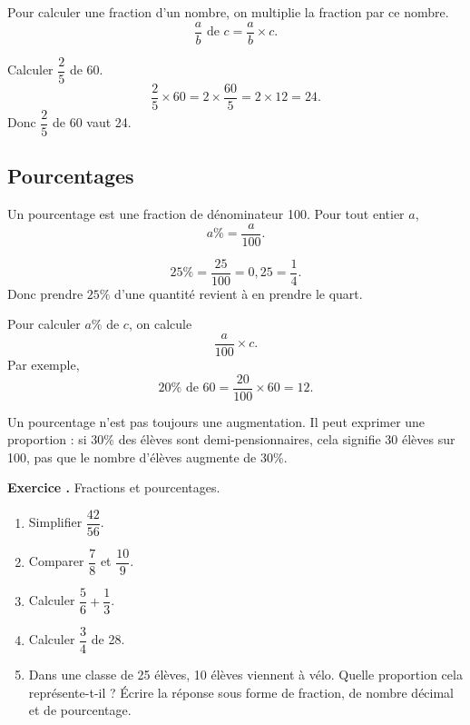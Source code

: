 \documentclass[11pt,a4paper]{article}
\newcounter{exo}
\newcommand{\exercice}[1]{\refstepcounter{exo}\begin{exobox}\textbf{Exercice \theexo.} #1\end{exobox}}
\begin{document}
\begin{proprbox}
Pour calculer une fraction d'un nombre, on multiplie la fraction par ce nombre.
\[
\frac{a}{b}\text{ de }c=\frac{a}{b}\times c.
\]
\end{proprbox}

\begin{exemplebox}
Calculer \(\dfrac{2}{5}\) de 60.
\[
\frac{2}{5}\times60=2\times\frac{60}{5}=2\times12=24.
\]
Donc \(\dfrac{2}{5}\) de 60 vaut 24.
\end{exemplebox}

\subsection{Pourcentages}

\begin{definitionbox}
Un pourcentage est une fraction de dénominateur 100. Pour tout entier \(a\),
\[
a\%=\frac{a}{100}.
\]
\end{definitionbox}

\begin{exemplebox}
\[
25\%=\frac{25}{100}=0,25=\frac{1}{4}.
\]
Donc prendre \(25\%\) d'une quantité revient à en prendre le quart.
\end{exemplebox}

\begin{methodbox}
Pour calculer \(a\%\) de \(c\), on calcule
\[
\frac{a}{100}\times c.
\]
Par exemple,
\[
20\%\text{ de }60=\frac{20}{100}\times60=12.
\]
\end{methodbox}

\begin{erreurbox}
Un pourcentage n'est pas toujours une augmentation. Il peut exprimer une proportion : si 30\% des élèves sont demi-pensionnaires, cela signifie 30 élèves sur 100, pas que le nombre d'élèves augmente de 30\%.
\end{erreurbox}

\exercice{Fractions et pourcentages.
\begin{enumerate}[label=\alph*)]
\item Simplifier \(\dfrac{42}{56}\).
\item Comparer \(\dfrac{7}{8}\) et \(\dfrac{10}{9}\).
\item Calculer \(\dfrac{5}{6}+\dfrac{1}{3}\).
\item Calculer \(\dfrac{3}{4}\) de 28.
\item Dans une classe de 25 élèves, 10 élèves viennent à vélo. Quelle proportion cela représente-t-il ? Écrire la réponse sous forme de fraction, de nombre décimal et de pourcentage.
\end{enumerate}}
\end{document}
